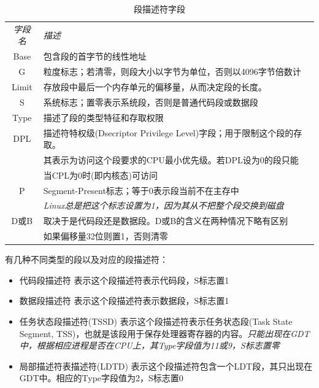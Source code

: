 \begin{table}[!htbp]
    \begin{center}
        \caption{段描述符字段}
        \begin{tabular}{c l}
            \hline
            \emph{字段名} & \emph{描述} \\
            Base & 包含段的首字节的线性地址 \\ 
            G & 粒度标志；若清零，则段大小以字节为单位，否则以4096字节倍数计 \\
            Limit & 存放段中最后一个内存单元的偏移量，从而决定段的长度。\\
            S & 系统标志；置零表示系统段，否则是普通代码段或数据段 \\
            Type & 描述了段的类型特征和存取权限 \\
            DPL & 描述符特权级(Dsecriptor Privilege Level)字段；用于限制这个段的存取。\\
            & 其表示为访问这个段要求的CPU最小优先级。若DPL设为0的段只能\\
            & 当CPL为0时(即内核态)可访问 \\
            P & Segment-Present标志；等于0表示段当前不在主存中\\ 
            & \emph{Linux总是把这个标志设置为1，因为其从不把整个段交换到磁盘}\\
            D或B & 取决于是代码段还是数据段。D或B的含义在两种情况下略有区别\\
            & 如果偏移量32位则置1，否则清零 \\
            \hline
        \end{tabular}
    \end{center}
\end{table}

    有几种不同类型的段以及对应的段描述符：

\begin{itemize}
    \item 代码段描述符
    \subitem 表示这个段描述符表示代码段，S标志置1
    \item 数据段描述符
    \subitem 表示这个段描述符表示数据段，S标志置1
    \item 任务状态段描述符(TSSD)
    \subitem 表示这个段描述符表示任务状态段(Task State Segment, TSS)，也就是该段用于保存处理器寄存器的内容。\emph{只能出现在GDT中，根据相应进程是否在CPU上，其Type字段值为11或9，S标志置零}
    \item 局部描述符表描述符(LDTD)
    \subitem 表示这个段描述符包含一个LDT段，其只出现在GDT中。相应的Type字段值为2，S标志置0
\end{itemize}


